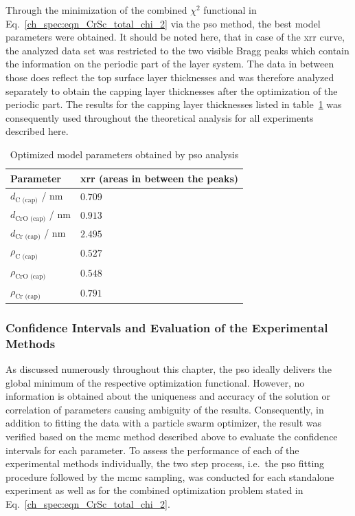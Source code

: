 Through the minimization of the combined $\chi^2$ functional in Eq.~\eqref{ch_spec:eqn_CrSc_total_chi_2} via the \gls{pso} method, the best model parameters were obtained. It should be noted here, that in case of the \gls{xrr} curve, the analyzed data set was restricted to the two visible Bragg peaks which contain the information on the periodic part of the layer system. The data in between those does reflect the top surface layer thicknesses and was therefore analyzed separately to obtain the capping layer thicknesses after the optimization of the periodic part. The results for the capping layer thicknesses listed in table~\ref{ch_spec:tbl_CrSc_best_model_capping} was consequently used throughout the theoretical analysis for all experiments described here.
\begin{table}[htbp]
\centering
\caption{Optimized model parameters obtained by \gls{pso} analysis}
\label{ch_spec:tbl_CrSc_best_model_capping}
\begin{tabular}{@{}ll@{}}
\toprule
Parameter &  \gls{xrr} (areas in between the peaks)\\ \midrule
$d_\text{C (cap)}$ / nm  & $0.709$ \\ 
$d_\text{CrO (cap)}$ / nm  & $0.913$ \\ 
$d_\text{Cr (cap)}$ / nm  & $ 2.495$ \\ 
$\rho_\text{C (cap)}$ & $0.527$\\ 
$\rho_\text{CrO (cap)}$& $0.548$\\
$\rho_\text{Cr (cap)}$ & $0.791$\\
 \bottomrule
\end{tabular}
\end{table}

\subsubsection{Confidence Intervals and Evaluation of the Experimental Methods}
As discussed numerously throughout this chapter, the \gls{pso} ideally delivers the global minimum of the respective optimization functional. However, no information is obtained about the uniqueness and accuracy of the solution or correlation of parameters causing ambiguity of the results. Consequently, in addition to fitting the data with a particle swarm optimizer, the result was verified based on the \gls{mcmc} method described above to evaluate the confidence intervals for each parameter. To assess the performance of each of the experimental methods individually, the two step process, i.e.~the \gls{pso} fitting procedure followed by the \gls{mcmc} sampling, was conducted for each standalone experiment as well as for the combined optimization problem stated in Eq.~\eqref{ch_spec:eqn_CrSc_total_chi_2}.

